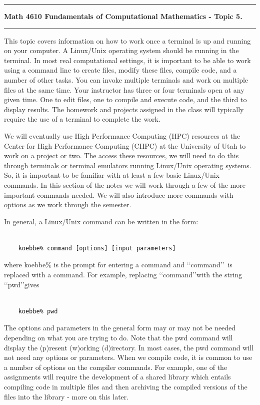 \documentclass[10pt,fleqn]{article}
\begin{document}
\vskip0.1in\hrule\vskip0.1in
\noindent
{\bf Math 4610 Fundamentals of Computational Mathematics  - Topic 5.}
\vskip0.1in\hrule\vskip0.1in

This topic covers information on how to work once a terminal is up and running
on your computer. A Linux/Unix operating system should be running in the
terminal. In most real computational settings, it is important to be able to
work using a command line to create files, modify these files, compile
code, and a number of other tasks. You can invoke multiple terminals and work on
multiple files at the same time. Your instructor has three or four terminals
open at any given time. One to edit files, one to compile and execute code, and
the third to display results. The homework and projects assigned in the class
will typically require the use of a terminal to complete the work.

We will eventually use High Performance Computing (HPC) resources at the Center
for High Performance Computing (CHPC) at the University of Utah to work on a
project or two. The access these resources, we will need to do this through
terminals or terminal emulators running Linux/Unix operating systems. So, it is
important to be familiar with at least a few basic Linux/Unix commands. In this
section of the notes we will work through a few of the more important commands
needed. We will also introduce more commands with options as we work through the
semester.

In general, a Linux/Unix command can be written in the form:
\begin{verbatim}

    koebbe% command [options] [input parameters]

\end{verbatim}
where koebbe\% is the prompt for entering a command and \lq\lq command\rq\rq\ is
replaced with a command. For example, replacing \lq\lq command\rq\rq with
the string \lq\lq pwd\rq\rq gives
\begin{verbatim}

    koebbe% pwd 

\end{verbatim}
The options and parameters in the general form may or may not be needed
depending on what you are trying to do. Note that the pwd command will display
the (p)resent (w)orking (d)irectory. In most cases, the pwd command will not
need any options or parameters. When we compile code, it is common to use a
number of options on the compiler commands. For example, one of the assignments
will require the development of a shared library which entails compiling code in
multiple files and then archiving the compiled versions of the files into the
library - more on this later.
\end{document}
